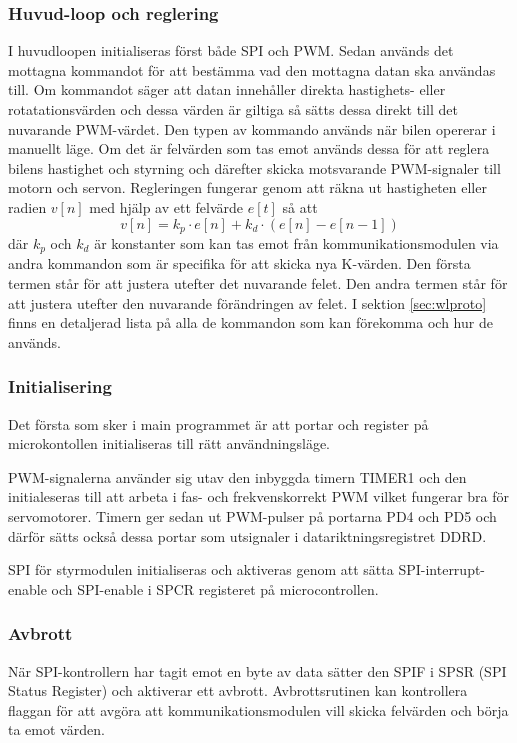 \documentclass[tekniskrapport/tech.tex]{subfiles}
\begin{document}
\subsubsection{Huvud-loop och reglering} I huvudloopen initialiseras först både
SPI och PWM. Sedan används det mottagna kommandot för att bestämma vad den
mottagna datan ska användas till. Om kommandot säger att datan innehåller
direkta hastighets- eller rotatationsvärden och dessa värden är giltiga så
sätts dessa direkt till det nuvarande PWM-värdet. Den typen av kommando används
när bilen opererar i manuellt läge. Om det är felvärden som tas emot används
dessa för att reglera bilens hastighet och styrning och därefter skicka
motsvarande PWM-signaler till motorn och servon.  Regleringen fungerar genom
att räkna ut hastigheten eller radien $v[n]$ med hjälp av ett felvärde $e[t]$
så att \begin{equation*} v[n] = k_p \cdot e[n] + k_d \cdot (e[n]-e[n-1])
\end{equation*} där $k_p$ och $k_d$ är konstanter som kan tas emot från
kommunikationsmodulen via andra kommandon som är specifika för att skicka
nya K-värden. Den första termen står för att justera utefter det nuvarande
felet. Den andra termen står för att justera utefter den nuvarande
förändringen av felet. I sektion \ref{sec:wlproto} finns en detaljerad
lista på alla de kommandon som kan förekomma och hur de används.

\subsubsection{Initialisering} Det första som sker i main programmet är att
portar och register på microkontollen initialiseras till rätt användningsläge.

PWM-signalerna använder sig utav den inbyggda timern TIMER1 och den
initialeseras till att arbeta i fas- och frekvenskorrekt PWM vilket fungerar
bra för servomotorer. Timern ger sedan ut PWM-pulser på portarna PD4 och PD5
och därför sätts också dessa portar som utsignaler i datariktningsregistret
DDRD. 

SPI för styrmodulen initialiseras och aktiveras genom att sätta
SPI-interrupt-enable och SPI-enable i SPCR registeret på microcontrollen.

\subsubsection{Avbrott} \label{sec:ctrl-int}
När SPI-kontrollern har tagit emot en byte av data sätter den SPIF i SPSR (SPI
Status Register) och aktiverar ett avbrott. Avbrottsrutinen kan kontrollera
flaggan för att avgöra att kommunikationsmodulen vill skicka felvärden och
börja ta emot värden.
\end{document}
